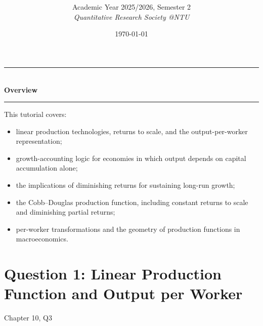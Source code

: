 \documentclass[12pt]{article}
\title{
\CourseCode \CourseName \\[0.3em]
\large \DocType
}
\author{
  Academic Year 2025/2026, Semester 2 \\[0.25em]
  \textit{Quantitative Research Society @NTU}
}
\date{\today}
\begin{document}
\maketitle
\thispagestyle{plainfirst}
\pagestyle{main}
\bigskip

\begin{center}
  \rule{0.8\textwidth}{0.4pt}\\[4pt]
  \textbf{Overview}\\[2pt]
  \rule{0.8\textwidth}{0.4pt}
\end{center}

\noindent
This tutorial covers:
\begin{itemize}[leftmargin=*]
  \item linear production technologies, returns to scale, and the output-per-worker representation;
  \item growth-accounting logic for economies in which output depends on capital accumulation alone;
  \item the implications of diminishing returns for sustaining long-run growth;
  \item the Cobb--Douglas production function, including constant returns to scale and diminishing partial returns;
  \item per-worker transformations and the geometry of production functions in macroeconomics.
\end{itemize}

\bigskip

\newpage
\tableofcontents

\newpage
\section{Question 1: Linear Production Function and Output per Worker}

\noindent
Chapter 10, Q3
\end{document}
